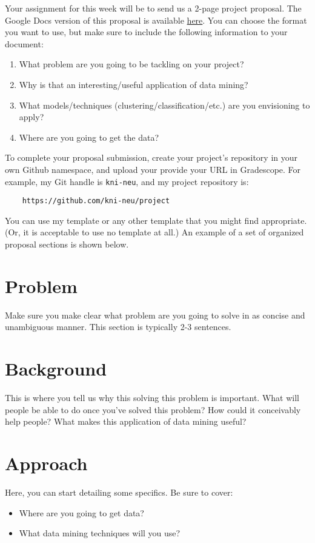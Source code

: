\documentclass[paper=a4, fontsize=11pt]{scrartcl} %
\author{
    \textbf{YOUR NAME} \\ 
    \textbf{YOUR GIT USERNAME} \\ 
    \textbf{YOUR E-MAIL}
}%
\begin{document}
\maketitle %


Your assignment for this week will be to send us a 2-page project proposal. The Google Docs version of this proposal is available \href{https://docs.google.com/document/d/14Mr8ed5dXt-zEOOucCBdzhDnmKYgnMIx}{here}. You can choose the format you want to use, but make sure to include the following information to your document:

\begin{enumerate}
    \item What problem are you going to be tackling on your project?
    \item Why is that an interesting/useful application of data mining?
    \item What models/techniques (clustering/classification/etc.) are you envisioning to apply?
    \item Where are you going to get the data?
\end{enumerate}

To complete your proposal submission, create your project's repository in your own Github namespace, and upload your provide your URL in Gradescope. For example, my Git handle is \verb"kni-neu", and my project repository is:

\begin{verbatim}
    https://github.com/kni-neu/project
\end{verbatim}

You can use my template or any other template that you might find appropriate. (Or, it is acceptable to use no template at all.) An example of a set of organized proposal sections is shown below.

\section{Problem}
Make sure you make clear what problem are you going to solve in as concise and unambiguous manner. This section is typically 2-3 sentences.

\section{Background} 
This is where you tell us why this solving this problem is important. What will people be able to do once you've solved this problem? How could it conceivably help people? What makes this application of data mining  useful?

\section{Approach}

Here, you can start detailing some specifics. Be sure to cover:

\begin{itemize}
    \item Where are you going to get data? 
    \item What data mining techniques will you use?
\end{itemize}
\end{document}
